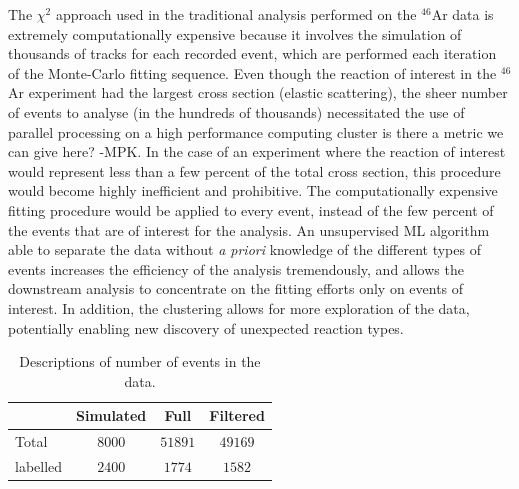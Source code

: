 \documentclass[review,number,sort&compress]{elsarticle}
\begin{document}
The $\chi^2$ approach used in the traditional analysis performed on the $^{46}$Ar data is extremely computationally expensive because it involves the simulation of thousands of tracks for each recorded event, which are performed each iteration of the Monte-Carlo fitting sequence. Even though the reaction of interest in the $^{46}$Ar experiment had the largest cross section (elastic scattering), the sheer number of events to analyse (in the hundreds of thousands) necessitated the use of parallel processing on a high performance computing cluster {\color{blue} is there a metric we can give here? -MPK}. In the case of an experiment where the reaction of interest would represent less than a few percent of the total cross section, this procedure would become highly inefficient and prohibitive. 
The computationally expensive fitting procedure would be applied to every event, instead of the few percent of the events that are of interest for the analysis.
An unsupervised ML algorithm able to separate the data without {\em a priori} knowledge of the different types of events increases the efficiency of the analysis tremendously, and allows the downstream analysis to concentrate on the fitting efforts only on events of interest. In addition, the clustering allows for more exploration of the data, potentially enabling new discovery of unexpected reaction types.




\begin{table}[hbtp]
\centering
\caption{Descriptions of number of events in the data.}\label{tab:data sets}
\begin{tabular}{lccc}
\toprule
{} & Simulated & Full & Filtered \\
\midrule
Total &  $8000$ & $51891$ & $49169$ \\
labelled & $2400$ & $1774$ &  $1582$ \\ 
\bottomrule
\end{tabular}
\end{table}
\end{document}
